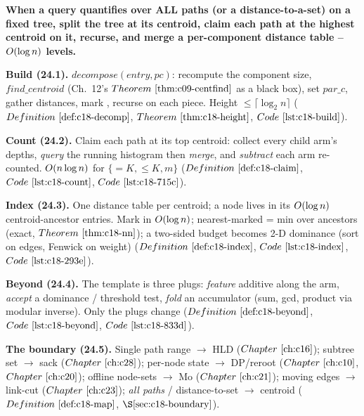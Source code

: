 \begin{quickref}
\textbf{When a query quantifies over ALL paths (or a distance-to-a-set) on a fixed tree, split the
tree at its centroid, claim each path at the highest centroid on it, recurse, and merge a
per-component distance table -- \(O(\log n)\) levels. }

\medskip
\textbf{Build (24.1).} \(\mathit{decompose}(\mathit{entry},\mathit{pc})\): recompute the
component size, \(\mathit{find\_centroid}\) (Ch.~12's \(\thmref{c09-centfind}\) as a black box),
set \(\mathit{par\_c}\), gather distances, mark , recurse on each piece. Height
\(\le\lceil\log_2 n\rceil\) (\(\defref{c18-decomp}\), \(\thmref{c18-height}\), \(\coderef{c18-build}\)).

\medskip
\textbf{Count (24.2).} Claim each path at its top centroid: collect every child arm's depths,
\emph{query} the running histogram then \emph{merge}, and \emph{subtract} each arm re-counted.
\(O(n\log n)\) for \(\{=K,\le K,\)\(m\}\)
(\(\defref{c18-claim}\), \(\coderef{c18-count}\), \(\coderef{c18-715c}\)).

\medskip
\textbf{Index (24.3).} One distance table per centroid; a node lives in its \(O(\log n)\)
centroid-ancestor entries. Mark in \(O(\log n)\); nearest-marked = min over ancestors
(exact, \(\thmref{c18-nn}\)); a two-sided budget becomes 2-D dominance (sort on edges, Fenwick on
weight) (\(\defref{c18-index}\), \(\coderef{c18-index}\), \(\coderef{c18-293e}\)).

\medskip
\textbf{Beyond (24.4).} The template is three plugs: \emph{feature} additive along the arm,
\emph{accept} a dominance / threshold test, \emph{fold} an accumulator (sum, gcd, product via
modular inverse). Only the plugs change (\(\defref{c18-beyond}\), \(\coderef{c18-beyond}\), \(\coderef{c18-833d}\)).

\medskip
\textbf{The boundary (24.5).} Single path range \(\to\) HLD (\(\chref{c16}\)); subtree set
\(\to\) sack (\(\chref{c28}\)); per-node state \(\to\) DP/reroot (\(\chref{c10}\), \(\chref{c20}\));
offline node-sets \(\to\) Mo (\(\chref{c21}\)); moving edges \(\to\) link-cut (\(\chref{c23}\));
\emph{all paths} / distance-to-set \(\to\) centroid (\(\defref{c18-map}\), \(\secref{c18-boundary}\)).
\end{quickref}

